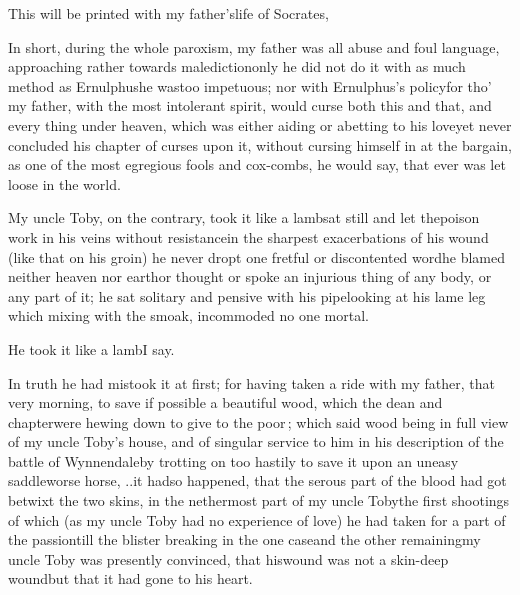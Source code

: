 \documentclass{article}
\begin{document}
\bigskip
\vbox{\fontsize{8}{10}\selectfont{}}

\indent
\bgroup\fontsize{9}{11}\selectfont
\fnast\enspace This will be printed with my
father’s\break life of Socrates, \etc \etc\par
\egroup

\newpage
In short, during the whole paroxism, my father was all abuse and foul language,
approaching rather towards malediction\tsh only he did not do it with as much method
as Ernulphus\tsh he was\break too impetuous; nor with Ernulphus’s policy\tsh for tho’ my
father, with the most intolerant spirit, would curse both this and that, and every
thing under heaven, which was either aiding or abetting to his love\tsh yet never
concluded his chapter of curses upon it, without cursing himself in at the bargain,
as one of the most egregious fools and cox-\break combs, he would say, that ever was let
loose in the world.

My uncle Toby, on the contrary, took it like a
lamb\tsh sat still and let the\pb poison work in his veins
without resistance\tsh in the sharpest exacerbations of
his wound (like that on his groin) he never dropt one fretful or
discontented word\tsh he blamed neither heaven nor
earth\tsh or thought or spoke an inju\-rious thing of any
body, or any part of it; he sat solitary and pensive with his
pipe\tsh looking at his lame leg \tsh\break 
{}
which mixing with the smoak, incommoded no one
mortal.

He took it like a lamb\tsh I say.


In truth he had mistook it at first; for having taken a ride with my father, that
very morning, to save if possible a beautiful wood, which the dean and chapter\pb were
hewing down to give to the poor\,; which said wood
being in full view of my uncle Toby’s house, and of singular service to him in his
description of the battle of Wynnendale\tsk by trotting on too hastily to save it\tsh
upon an uneasy saddle\tsh worse horse, \etc \etc .\@ .\@  it had\break so happened, that the
serous part of the blood had got betwixt the two skins, in the nethermost part of my
uncle Toby\break\tsk the first shootings of which (as my uncle Toby had no
experience of love) he had taken for a part of the passion\tsk\break till the blister
breaking in the one case\tsk\break and the other remaining\tsk my uncle Toby was presently
convinced, that his\pb wound was not a skin-deep wound\tsh\break but that it had
gone to his heart.
\end{document}
